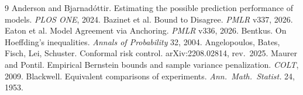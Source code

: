 \documentclass[11pt,a4paper]{article}
\theoremstyle{definition}
\theoremstyle{remark}
\begin{document}
\begingroup\small
\begin{thebibliography}{9}
 Anderson and Bjarnad\'ottir. Estimating the possible prediction performance of models. \emph{PLOS ONE}, 2024.
 Bazinet et al. Bound to Disagree. \emph{PMLR} v337, 2026.
 Eaton et al. Model Agreement via Anchoring. \emph{PMLR} v336, 2026.
 Bentkus. On Hoeffding's inequalities. \emph{Annals of Probability} 32, 2004.
 Angelopoulos, Bates, Fisch, Lei, Schuster. Conformal risk control. arXiv:2208.02814, rev.\ 2025.
 Maurer and Pontil. Empirical Bernstein bounds and sample variance penalization. \emph{COLT}, 2009.
 Blackwell. Equivalent comparisons of experiments. \emph{Ann.\ Math.\ Statist.} 24, 1953.
\end{thebibliography}
\endgroup
\end{document}
